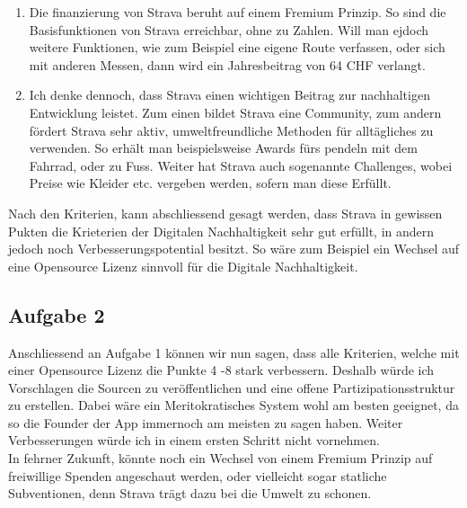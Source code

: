 \documentclass[10pt]{article}
\newcommand{\problem}[1]{\subsection{#1}}
\begin{document}
\begin{enumerate}
    	\item Die finanzierung von Strava beruht auf einem Fremium Prinzip. So sind die Basisfunktionen von Strava erreichbar, ohne zu Zahlen. Will man ejdoch weitere Funktionen, wie zum Beispiel eine eigene Route verfassen, oder sich mit anderen Messen, dann wird ein Jahresbeitrag von 64 CHF verlangt. 
    	\item Ich denke dennoch, dass Strava einen wichtigen Beitrag zur nachhaltigen Entwicklung leistet. Zum einen bildet Strava eine Community, zum andern fördert Strava sehr aktiv, umweltfreundliche Methoden für alltägliches zu verwenden. So erhält man beispielsweise Awards fürs pendeln mit dem Fahrrad, oder zu Fuss. Weiter hat Strava auch sogenannte Challenges, wobei Preise wie Kleider etc. vergeben werden, sofern man diese Erfüllt.
    \end{enumerate}

Nach den Kriterien, kann abschliessend gesagt werden, dass Strava in gewissen Pukten die Krieterien der Digitalen Nachhaltigkeit sehr gut erfüllt, in andern jedoch noch Verbesserungspotential besitzt. So wäre zum Beispiel ein Wechsel auf eine Opensource Lizenz sinnvoll für die Digitale Nachhaltigkeit. 

    \problem{Aufgabe 2}
        Anschliessend an Aufgabe 1 können wir nun sagen, dass alle Kriterien, welche mit einer Opensource Lizenz die Punkte 4 -8 stark verbessern. Deshalb würde ich Vorschlagen die Sourcen zu veröffentlichen und eine offene Partizipationsstruktur zu erstellen. Dabei wäre ein Meritokratisches System wohl am besten geeignet, da so die Founder der App immernoch am meisten zu sagen haben. Weiter Verbesserungen würde ich in einem ersten Schritt nicht vornehmen. \\
        
        In fehrner Zukunft, könnte noch ein Wechsel von einem Fremium Prinzip auf freiwillige Spenden angeschaut werden, oder vielleicht sogar statliche Subventionen, denn Strava trägt dazu bei die Umwelt zu schonen. 
\end{document}
